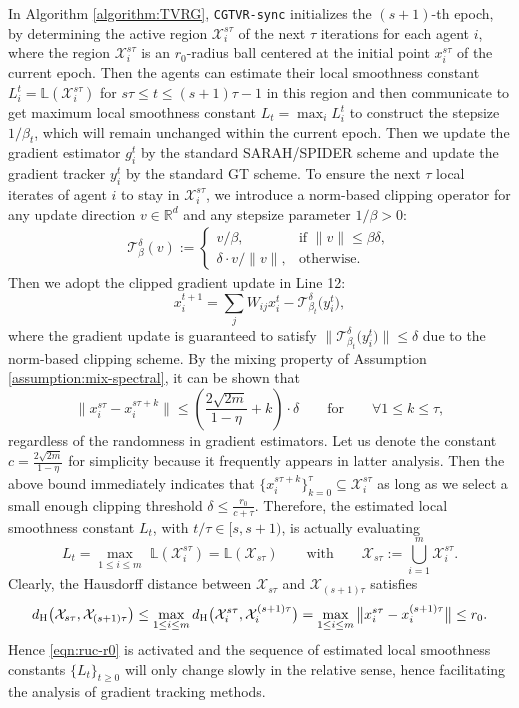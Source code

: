 \documentclass{article}
\newcommand{\cX}{\mathcal{X}}
\newcommand{\bL}{\mathbb{L}}
\newcommand{\ctdb}{\mathcal{T}^\delta_{\beta_t}}
\newcommand{\git}{g_{i}^t}
\newcommand{\RR}{\mathbb{R}}
\begin{document}
In Algorithm \ref{algorithm:TVRG}, \texttt{CGTVR-sync} initializes the $(s+1)$-th epoch, by determining the active region $\cX_{i}^{s\tau}$ of the next $\tau$ iterations for each agent $i$, where the region $\cX_{i}^{s\tau}$ is an $r_0$-radius ball centered at the initial point $x_{i}^{s\tau}$ of the current epoch. Then the agents can estimate their local smoothness constant $L_i^{t}=\bL(\cX_{i}^{s\tau})$ for $s\tau\leq t\leq (s+1)\tau-1$ in this region and then communicate to get maximum local smoothness constant $L_{t} = \max_i L_i^{t}$ to construct the stepsize $1/\beta_t$, which will remain unchanged within the current epoch. Then we update the gradient estimator $\git$ by the standard SARAH/SPIDER scheme and update the gradient tracker $y_i^t$ by the standard GT scheme. To ensure the next $\tau$ local iterates of agent $i$ to stay in $\cX_{i}^{s\tau}$, we introduce a norm-based clipping operator for any update direction $v\in\RR^d$ and any stepsize parameter $1/\beta>0$: 
\begin{align}
\label{defn:clip-operator}
\mathcal{T}_\beta^\delta(v):= \begin{cases}
    v/\beta,& \mbox{if }\|v\|\leq \beta\delta,\\
    {\delta\cdot v}/{\|v\|}, &\mbox{otherwise}.
\end{cases}
\end{align}
Then we adopt the clipped gradient update in Line 12:
\begin{equation}
    \label{eqn:clipped-update}
    x_i^{t+1} = \sum_{j}W_{ij}x_i^t - \ctdb \big(y_i^t\big),
\end{equation}
where the gradient update is guaranteed to satisfy $\|\ctdb \big(y_i^t\big)\|\leq \delta$ due to the norm-based clipping scheme. By the mixing property of Assumption \ref{assumption:mix-spectral}, it can be shown that 
\begin{equation}
    \label{eqn:sync-epoch-radii}
    \big\|x_{i}^{s\tau}-x_i^{s\tau+k}\big\|\leq \left(\frac{2\sqrt{2m}}{1-\eta}+k\right)\cdot \delta \qquad\mbox{for}\qquad\forall 1\leq k\leq \tau,
\end{equation}
regardless of the randomness in gradient estimators. Let us denote the constant $c = \frac{2\sqrt{2m}}{1-\eta}$ for simplicity because it frequently appears in latter analysis. Then the above bound immediately indicates that $\{x_{i}^{s\tau+k}\}_{k=0}^{\tau} \subseteq \cX_{i}^{s\tau}$ as long as we select a small enough clipping threshold $ \delta \leq \frac{r_0}{c+\tau}$. Therefore, the estimated local smoothness constant $L_{t}$, with $t/\tau\in[s,s+1)$, is actually evaluating
$$L_t = \max_{1\leq i\leq m}\,\,\bL(\cX_{i}^{s\tau}) = \bL(\cX_{s\tau})\qquad\mbox{with}\qquad \cX_{s\tau} := \bigcup^m_{i=1}\cX_{i}^{s\tau}.$$
Clearly, the Hausdorff distance between $\cX_{s\tau}$ and $\cX_{(s+1)\tau}$ satisfies
$$d_{\rm H}\big(\cX_{s\tau},\cX_{(s+1)\tau}\big)\leq\max_{1\leq i\leq m}d_{\rm H}\big(\cX_{i}^{s\tau},\cX_{i}^{(s+1)\tau}\big) = \max_{1\leq i\leq m}\big\|x_{i}^{s\tau}-x_i^{(s+1)\tau}\big\| \leq r_0.$$
Hence \eqref{eqn:ruc-r0} is activated and the sequence of estimated local smoothness constants $\{L_t\}_{t\geq0}$ will only change slowly in the relative sense, hence facilitating the analysis of gradient tracking methods. 
\end{document}
